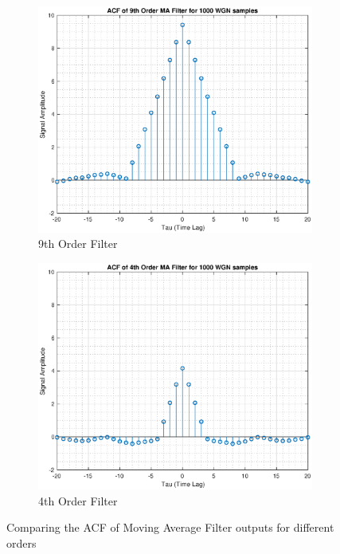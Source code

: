 \begin{figure}[h!]
\centering
\begin{subfigure}{0.32\textwidth}
\centering
\includegraphics[width = \textwidth]{acf_corr_9}
\caption{9th Order Filter}
\label{fig:acf_corr_9}
\end{subfigure}
\begin{subfigure}{0.32\textwidth}
\centering
\includegraphics[width = \textwidth]{acf_corr_4}
\caption{4th Order Filter}
\label{fig:acf_corr_4}
\end{subfigure}
\caption{Comparing the ACF of Moving Average Filter outputs for different orders}
\label{fig:acf_corr}
\end{figure}

